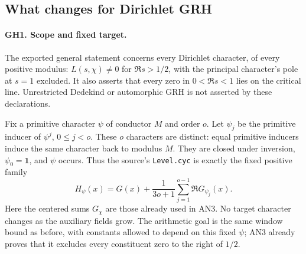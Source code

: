 \subsection{What changes for Dirichlet GRH}

\paragraph{GH1. Scope and fixed target.}
The exported general statement concerns every Dirichlet character, of every
positive modulus: $L(s,\chi)\ne0$ for $\Re s>1/2$, with the principal
character's pole at $s=1$ excluded.  It also asserts that every zero in
$0<\Re s<1$ lies on the critical line.  Unrestricted Dedekind or
automorphic GRH is not asserted by these declarations.

Fix a primitive character $\psi$ of conductor $M$ and order $o$.
Let $\psi_j$ be the primitive inducer of $\psi^j$, $0\le j<o$.
These $o$ characters are distinct: equal primitive inducers induce the
same character back to modulus $M$.  They are closed under inversion,
$\psi_0=\mathbf1$, and $\psi$ occurs.  Thus the source's
\texttt{Level.cyc} is exactly the fixed positive family
\[
 H_\psi(x)=G(x)+\frac1{3o+1}\sum_{j=1}^{o-1}\Re G_{\psi_j}(x).
 \tag{GH2}
\]
Here the centered sums $G_\chi$ are those already used in AN3.  No target
character changes as the auxiliary fields grow.  The arithmetic goal is
the same window bound as before, with constants allowed to depend on this
fixed $\psi$; AN3 already proves that it excludes every constituent zero
to the right of $1/2$.

